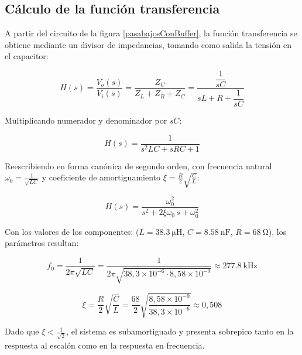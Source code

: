 \subsection{Cálculo de la función transferencia}

A partir del circuito de la figura \ref{pasabajosConBuffer}, la función 
transferencia se obtiene mediante un divisor de impedancias, tomando como 
salida la tensión en el capacitor:

\begin{equation}
    H(s) = \frac{V_o(s)}{V_i(s)} = \frac{Z_C}{Z_L + Z_R + Z_C} 
         = \frac{\dfrac{1}{sC}}{sL + R + \dfrac{1}{sC}}
    \label{eq:H_divisor}
\end{equation}

Multiplicando numerador y denominador por $sC$:

\begin{equation}
    H(s) = \frac{1}{s^2LC + sRC + 1}
    \label{eq:H_s}
\end{equation}

Reescribiendo en forma canónica de segundo orden, con frecuencia natural 
$\omega_0 = \frac{1}{\sqrt{LC}}$ y coeficiente de amortiguamiento 
$\xi = \frac{R}{2}\sqrt{\frac{C}{L}}$:

\begin{equation}
    H(s) = \frac{\omega_0^2}{s^2 + 2\xi\omega_0\, s + \omega_0^2}
    \label{eq:H_canonica}
\end{equation}

Con los valores de los componentes: ($L = \SI{38.3}{\micro\henry}$, 
$C = \SI{8.58}{\nano\farad}$, $R = \SI{68}{\ohm}$), los parámetros resultan:

\begin{equation}
    f_0 = \frac{1}{2\pi\sqrt{LC}} 
        = \frac{1}{2\pi\sqrt{38{,}3\times10^{-6}\cdot 8{,}58\times10^{-9}}} 
        \approx \SI{277.8}{\kilo\hertz}
    \label{eq:f0_pasabajos}
\end{equation}

\begin{equation}
    \xi = \frac{R}{2}\sqrt{\frac{C}{L}} 
        = \frac{68}{2}\sqrt{\frac{8{,}58\times10^{-9}}{38{,}3\times10^{-6}}} 
        \approx 0{,}508
    \label{eq:xi_pasabajos}
\end{equation}

Dado que $\xi < \frac{1}{\sqrt{2}}$, el sistema es subamortiguado y presenta 
sobrepico tanto en la respuesta al escalón como en la respuesta en frecuencia.



